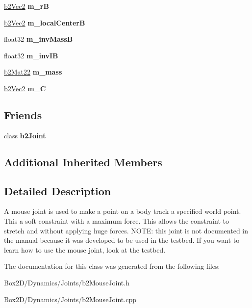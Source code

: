 \begin{DoxyCompactItemize}
\hyperlink{structb2_vec2}{b2\+Vec2} {\bfseries m\+\_\+rB}
\item 
\mbox{\label{classb2_mouse_joint_ad9947876df55f4b4e7d435941234e22e}} 
\hyperlink{structb2_vec2}{b2\+Vec2} {\bfseries m\+\_\+local\+CenterB}
\item 
\mbox{\label{classb2_mouse_joint_a84c405322a35b0f2649071cdcd7be0fb}} 
float32 {\bfseries m\+\_\+inv\+MassB}
\item 
\mbox{\label{classb2_mouse_joint_a0a4959ae588d0071d97424e36f15228e}} 
float32 {\bfseries m\+\_\+inv\+IB}
\item 
\mbox{\label{classb2_mouse_joint_a628b7a7a2cd2b50313daea30baf47c4e}} 
\hyperlink{structb2_mat22}{b2\+Mat22} {\bfseries m\+\_\+mass}
\item 
\mbox{\label{classb2_mouse_joint_a7ea02e17cdde70717e84bf44614275fb}} 
\hyperlink{structb2_vec2}{b2\+Vec2} {\bfseries m\+\_\+C}
\end{DoxyCompactItemize}
\subsection*{Friends}
\begin{DoxyCompactItemize}
\item 
\mbox{\label{classb2_mouse_joint_a54ade8ed3d794298108d7f4c4e4793fa}} 
class {\bfseries b2\+Joint}
\end{DoxyCompactItemize}
\subsection*{Additional Inherited Members}


\subsection{Detailed Description}
A mouse joint is used to make a point on a body track a specified world point. This a soft constraint with a maximum force. This allows the constraint to stretch and without applying huge forces. N\+O\+TE\+: this joint is not documented in the manual because it was developed to be used in the testbed. If you want to learn how to use the mouse joint, look at the testbed. 

The documentation for this class was generated from the following files\+:\begin{DoxyCompactItemize}
\item 
Box2\+D/\+Dynamics/\+Joints/b2\+Mouse\+Joint.\+h\item 
Box2\+D/\+Dynamics/\+Joints/b2\+Mouse\+Joint.\+cpp\end{DoxyCompactItemize}
